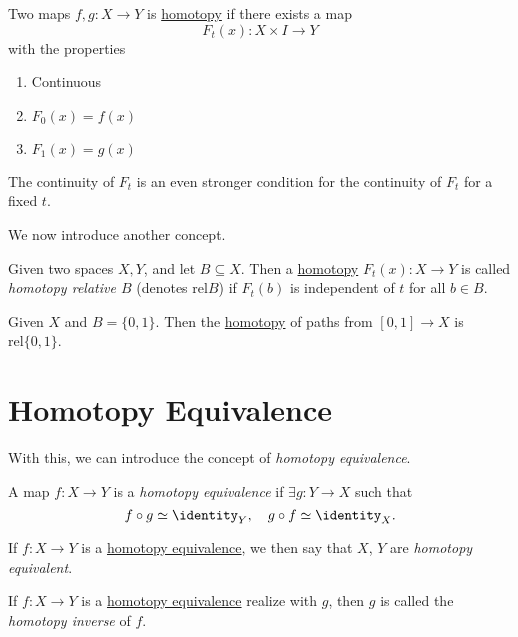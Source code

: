 \begin{prev}
	Two maps \(f, g\colon X\to Y\) is \hyperref[def:homotopy]{homotopy} if there exists a map
	\[
		F_t(x)\colon X\times I\to Y
	\]
	with the properties
	\begin{enumerate}
		\item Continuous
		\item \(F_0(x) = f(x)\)
		\item \(F_1(x) = g(x)\)
	\end{enumerate}
	\begin{remark}
		The continuity of \(F_t\) is an even stronger condition for the continuity of \(F_t\) for a fixed \(t\).
	\end{remark}
\end{prev}

We now introduce another concept.
\begin{definition}\label{def:homotopy-relative}
	Given two spaces \(X, Y\), and let \(B\subseteq X\). Then a \hyperref[def:homotopy]{homotopy} \(F_t(x)\colon X\to Y\) is called
	\emph{homotopy relative \(B\)} (denotes \(\mathrm{rel} B\)) if \(F_t(b)\) is independent of \(t\) for all \(b\in B\).
\end{definition}

\begin{eg}
	Given \(X\) and \(B = \{0, 1\}\). Then the \hyperref[def:homotopy]{homotopy} of paths from \([0, 1]\to X\) is
	\(\mathrm{rel} \{0, 1\}\).
	\begin{figure}[H]
		\centering
		\label{fig:eg:rel-homotopy}
	\end{figure}
\end{eg}

\section{Homotopy Equivalence}
With this, we can introduce the concept of \emph{homotopy equivalence}.
\begin{definition}\label{def:homotopy-equivalence}
	A map \(f\colon X\to Y\) is a \emph{homotopy equivalence} if \(\exists g\colon Y\to X\) such that
	\[
		f\circ g \simeq \identity_Y, \quad g\circ f \simeq \identity_X.
	\]

	\begin{figure}[H]
		\centering
		\label{fig:def:homotopy-equivalence}
	\end{figure}
\end{definition}
\begin{definition}\label{def:homotopy-equivalent}
	If \(f\colon X\to Y\) is a \hyperref[def:homotopy-equivalence]{homotopy equivalence}, we then say that \(X\), \(Y\) are \emph{homotopy equivalent}.
\end{definition}
\begin{definition}\label{def:homotopy-inverse}
	If \(f\colon X\to Y\) is a \hyperref[def:homotopy-equivalence]{homotopy equivalence} realize with \(g\), then \(g\) is called the \emph{homotopy inverse} of \(f\).
\end{definition}

